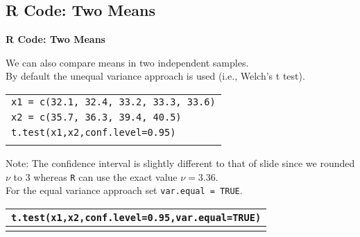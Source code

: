 \documentclass[compress]{beamer}        %
\makeatletter
\newcommand{\tcb}{\textcolor{beamer@blendedblue}}
\makeatother
\begin{document}
\subsection{R Code: Two Means}
\begin{frame}{\bf \tcb{R Code: Two Means}}

We can also compare means in two independent samples.\\[0.2cm]

By default the unequal variance approach is used (i.e., Welch's t test).\\[0.2cm]
\begin{tabular}{|l|}
\hline
\texttt{x1 = c(32.1, 32.4, 33.2, 33.3, 33.6)}\\[0.2cm]
\texttt{x2 = c(35.7, 36.3, 39.4, 40.5)}\\[0.2cm]
\texttt{t.test(x1,x2,conf.level=0.95)}\\
\hline
\multicolumn{1}{c}{}\\[0.0cm]
\end{tabular}

Note: The confidence interval is slightly different to that of slide \pageref{uneqvar} since we rounded $\nu$ to 3 whereas \texttt{R} can use the exact value $\nu=3.36$.\\[0.8cm]


For the equal variance approach set \texttt{var.equal = TRUE}.\\[0.2cm]
\begin{tabular}{|l|}
\hline
\texttt{t.test(x1,x2,conf.level=0.95,var.equal=TRUE)}\\
\hline
\multicolumn{1}{c}{}\\[0.2cm]
\end{tabular}


\end{frame}
\end{document}
